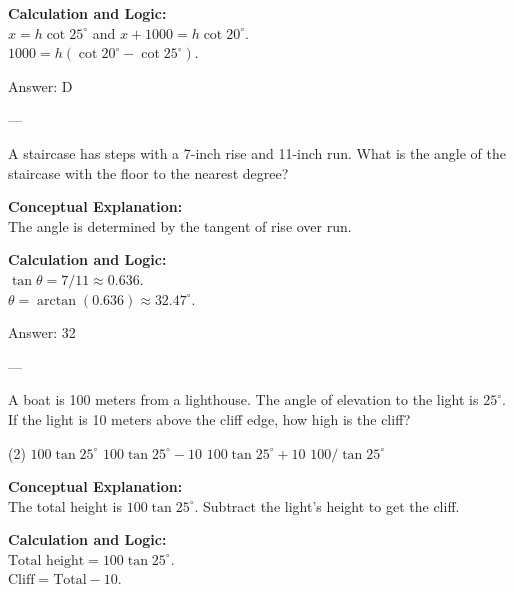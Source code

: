 \documentclass[11pt,paper=a4,answers]{exam}
\begin{document}
\begin{questions}
\begin{solution}
\vspace{10pt}
\textbf{Calculation and Logic:} \\
$x = h \cot 25^\circ$ and $x + 1000 = h \cot 20^\circ$. \\
$1000 = h(\cot 20^\circ - \cot 25^\circ)$.

\vspace{15pt}
Answer: \colorbox{yellow!100}{D}
\end{solution}

---

\question
A staircase has steps with a 7-inch rise and 11-inch run. What is the angle of the staircase with the floor to the nearest degree?

\begin{solution}
\textbf{Conceptual Explanation:} \\
The angle is determined by the tangent of rise over run.

\vspace{10pt}
\textbf{Calculation and Logic:} \\
$\tan \theta = 7/11 \approx 0.636$. \\
$\theta = \arctan(0.636) \approx 32.47^\circ$.

\vspace{15pt}
Answer: \colorbox{yellow!100}{32}
\end{solution}

---

\question
A boat is 100 meters from a lighthouse. The angle of elevation to the light is $25^\circ$. If the light is 10 meters above the cliff edge, how high is the cliff?
\begin{tasks}(2)
    \task $100 \tan 25^\circ$
    \task $100 \tan 25^\circ - 10$
    \task $100 \tan 25^\circ + 10$
    \task $100 / \tan 25^\circ$
\end{tasks}

\begin{solution}
\textbf{Conceptual Explanation:} \\
The total height is $100 \tan 25^\circ$. Subtract the light's height to get the cliff.

\vspace{10pt}
\textbf{Calculation and Logic:} \\
$\text{Total height} = 100 \tan 25^\circ$. \\
$\text{Cliff} = \text{Total} - 10$.


\end{solution}
\end{questions}
\end{document}
